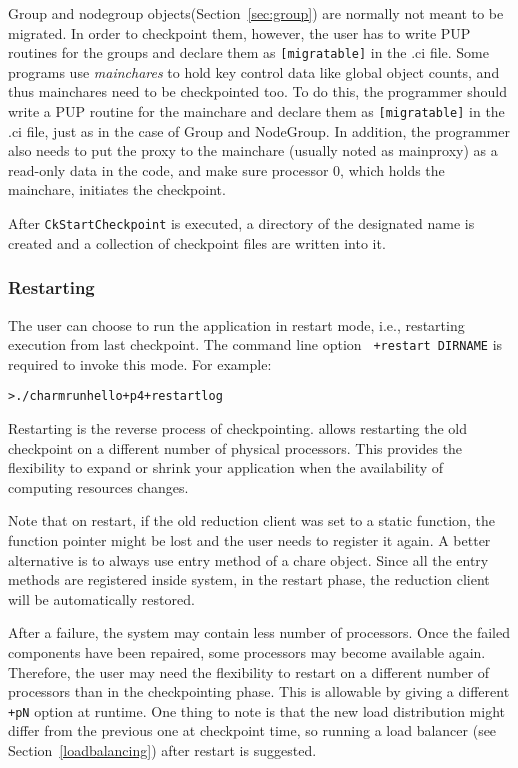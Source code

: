 Group and nodegroup objects(Section~\ref{sec:group}) are normally not 
meant to be migrated. In order to checkpoint them, however, the user 
has to write PUP routines for the groups and declare them as 
{\tt [migratable]} in the .ci file. Some programs use {\it mainchares}
to hold key control data like global object counts, and thus mainchares need to be checkpointed too. To do this, the programmer should write
a PUP routine for the mainchare and declare them as {\tt [migratable]} 
in the .ci file, just as in the case of Group and NodeGroup. In addition,
the programmer also needs to put the proxy to the mainchare (usually 
noted as mainproxy) as a read-only data in the code, and make sure 
processor 0, which holds the mainchare, initiates the checkpoint.

After {\tt CkStartCheckpoint} is executed, a directory of the designated
name is created and a collection of checkpoint files are written into it. 

\subsubsection{Restarting}

The user can choose to run the \charmpp{} application in restart mode, i.e.,
restarting execution from last checkpoint. The command line option {\tt
+restart DIRNAME} is required to invoke this mode. For example:

\begin{alltt}
  > ./charmrun hello +p4 +restart log
\end{alltt}

Restarting is the reverse process of checkpointing. \charmpp{} allows 
restarting the old checkpoint on a different number of physical processors.
This provides the flexibility to expand or shrink your application when
the availability of computing resources changes. 

Note that on restart, if the old reduction client was set to a static 
function, the function pointer might be lost and the user needs to register
it again. A better alternative is to always use entry method of a chare
object. Since all the entry methods are registered inside \charmpp{} system,
in the restart phase, the reduction client will be automatically restored.

After a failure, the system may contain less number of processors. Once the failed components have been repaired, some processors may become available again. Therefore,
the user may need the flexibility to restart on a different number of processors
than in the checkpointing phase. This is allowable by giving a different 
{\tt +pN} option at runtime. One thing to note is that the new load 
distribution might differ from the previous one at checkpoint time,
so running a load balancer (see Section~\ref{loadbalancing}) after restart is suggested. 

